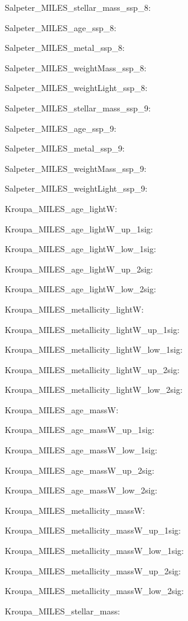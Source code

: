 \item Salpeter\_MILES\_stellar\_mass\_ssp\_8: 
\item Salpeter\_MILES\_age\_ssp\_8: 
\item Salpeter\_MILES\_metal\_ssp\_8: 
\item Salpeter\_MILES\_weightMass\_ssp\_8: 
\item Salpeter\_MILES\_weightLight\_ssp\_8: 
\item Salpeter\_MILES\_stellar\_mass\_ssp\_9: 
\item Salpeter\_MILES\_age\_ssp\_9: 
\item Salpeter\_MILES\_metal\_ssp\_9: 
\item Salpeter\_MILES\_weightMass\_ssp\_9: 
\item Salpeter\_MILES\_weightLight\_ssp\_9: 
\item Kroupa\_MILES\_age\_lightW: 
\item Kroupa\_MILES\_age\_lightW\_up\_1sig: 
\item Kroupa\_MILES\_age\_lightW\_low\_1sig: 
\item Kroupa\_MILES\_age\_lightW\_up\_2sig: 
\item Kroupa\_MILES\_age\_lightW\_low\_2sig: 
\item Kroupa\_MILES\_metallicity\_lightW: 
\item Kroupa\_MILES\_metallicity\_lightW\_up\_1sig: 
\item Kroupa\_MILES\_metallicity\_lightW\_low\_1sig: 
\item Kroupa\_MILES\_metallicity\_lightW\_up\_2sig: 
\item Kroupa\_MILES\_metallicity\_lightW\_low\_2sig: 
\item Kroupa\_MILES\_age\_massW: 
\item Kroupa\_MILES\_age\_massW\_up\_1sig: 
\item Kroupa\_MILES\_age\_massW\_low\_1sig: 
\item Kroupa\_MILES\_age\_massW\_up\_2sig: 
\item Kroupa\_MILES\_age\_massW\_low\_2sig: 
\item Kroupa\_MILES\_metallicity\_massW: 
\item Kroupa\_MILES\_metallicity\_massW\_up\_1sig: 
\item Kroupa\_MILES\_metallicity\_massW\_low\_1sig: 
\item Kroupa\_MILES\_metallicity\_massW\_up\_2sig: 
\item Kroupa\_MILES\_metallicity\_massW\_low\_2sig: 
\item Kroupa\_MILES\_stellar\_mass: 
